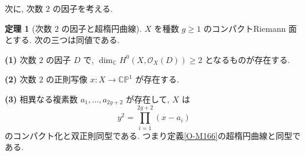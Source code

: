 \documentclass[dvipdfmx,a4paper,11pt]{article} %
\newcommand{\C}{\mathbb{C}}
\theoremstyle{definition}
\newtheorem{thm}{定理}[section]
\numberwithin{equation}{section}
\begin{document}
次に, 次数 $2$ の因子を考える.

\begin{thm}[次数 $2$ の因子と超楕円曲線]
\label{O-M362}\label{O-M363}
$X$ を種数 $g\geq1$ のコンパクトRiemann 面とする.
次の三つは同値である.

\medskip
\noindent
\textbf{(1)}
次数 $2$ の因子 $D$ で,
$\dim_\C H^0(X,\mathcal O_X(D))\geq2$ となるものが存在する.

\medskip
\noindent
\textbf{(2)}
次数 $2$ の正則写像 $x:X\to\C\mathbb P^1$ が存在する.

\medskip
\noindent
\textbf{(3)}
相異なる複素数 $a_1,\ldots,a_{2g+2}$ が存在して,
$X$ は
\begin{equation}\label{O-EQ128}
y^2=\prod_{i=1}^{2g+2}(x-a_i)
\end{equation}
のコンパクト化と双正則同型である.
つまり定義\ref{O-M166}の超楕円曲線と同型である. 
\end{thm}
\end{document}

